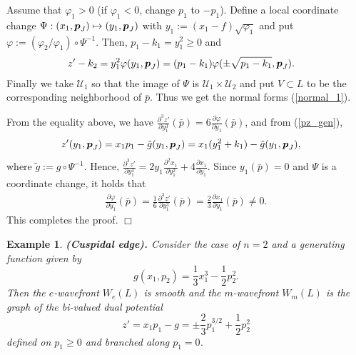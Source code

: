 \documentclass[10pt]{amsart}
\def\qed{\hfill $\Box$}
\newcommand{\U}{\mathcal{U}}
\def\qed{\hfill $\Box$}
\def\rd{\partial}
\def\bp{\mbox{\boldmath $p$}}
\newtheorem{exam}[thm]{\bf Example}
\newcommand{\vp}{\varphi}
\begin{document}
Assume that $\varphi_1 > 0$ (if $\vp_1 < 0$, change $p_1$ to $-p_1$). 
Define a local coordinate change $\Psi:(x_1, \bp_J)\mapsto(y_1, \bp_J)$ with $y_1:=(x_1-f)\sqrt{\varphi_1}$ and put $\vp:=(\vp_2/\vp_1)\circ\Psi^{-1}$. 
Then, $p_1 - k_1=y_1^2 \geq 0$ and 
\begin{align*}
z'-k_2 &= y_1^2\vp(y_1, \bp_J)= (p_1-k_1)\vp(\pm\sqrt{p_1-k_1}, \bp_J).
\end{align*} 
Finally we take $\U_1$ so that the image of $\Psi$ is $\U_1\times\U_2$ and put $V\subset L$ to be the corresponding neighborhood of $\bar{p}$.
Thus we get the normal forms (\ref{normal_1}). 

From the equality above, we have $\frac{\rd^3 z'}{\rd y_1^3}(\bar{p})=6\frac{\rd\vp}{\rd y_1}(\bar{p})$, 
and from (\ref{pz_gen}),
\begin{align*}
z'(y_1, \bp_J) &= x_1p_1 - \tilde{g}(y_1, \bp_J)= x_1(y_1^2 + k_1) - \tilde{g}(y_1, \bp_J),
\end{align*}
where $\tilde{g}:=g\circ\Psi^{-1}$. 
Hence, $\frac{\rd^3 z'}{\rd y_1^3}=2y_1\frac{\rd^2 x_1}{\rd y_1^2} + 4\frac{\rd x_1}{\rd y_1}$. 
Since $y_1(\bar{p})=0$ and $\Psi$ is a coordinate change, it holds that
\begin{align*}
\frac{\rd\vp}{\rd y_1}(\bar{p})=\frac{1}{6}\frac{\rd^3 z'}{\rd y_1^3}(\bar{p}) = \frac{2}{3}\frac{\rd x_1}{\rd y_1}(\bar{p})\neq 0.
\end{align*}
This completes the proof. 
\qed




\begin{exam}\label{A2}\upshape
{\bf (Cuspidal edge).} 
Consider the case of $n=2$ and a generating function given by  
$$g(x_1, p_2) = \frac{1}{3}x_1^3 - \frac{1}{2}p_2^2.$$
Then the $e$-wavefront $W_e(L)$ is smooth and the $m$-wavefront $W_m(L)$ is the graph of the bi-valued dual potential 
$$z'=x_1p_1-g=\pm\frac{2}{3}p_1^{3/2}+\frac{1}{2}p_2^2$$  
defined on $p_1\ge 0$ and branched along $p_1=0$.  
\end{exam}
\end{document}
